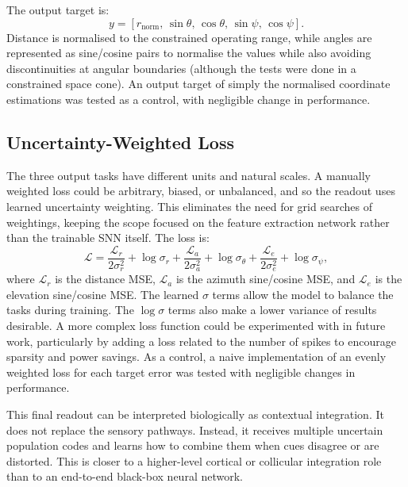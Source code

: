 The output target is:
\begin{equation}
    y =
    \left[
    r_{\text{norm}},\,
    \sin \theta,\,
    \cos \theta,\,
    \sin \psi,\,
    \cos \psi
    \right].
\end{equation}
Distance is normalised to the constrained operating range, while angles are represented as sine/cosine pairs to normalise the values while also avoiding discontinuities at angular boundaries (although the tests were done in a constrained space cone). An output target of simply the normalised coordinate estimations was tested as a control, with negligible change in performance.

\subsection{Uncertainty-Weighted Loss}

The three output tasks have different units and natural scales. A manually weighted loss could be arbitrary, biased, or unbalanced, and so the readout uses learned uncertainty weighting. This eliminates the need for grid searches of weightings, keeping the scope focused on the feature extraction network rather than the trainable SNN itself. The loss is:
\begin{equation}
    \mathcal{L} =
    \frac{\mathcal{L}_r}{2\sigma_r^2} + \log\sigma_r
    + \frac{\mathcal{L}_a}{2\sigma_a^2} + \log\sigma_{\theta}
    + \frac{\mathcal{L}_e}{2\sigma_e^2} + \log\sigma_{\psi},
\end{equation}
where $\mathcal{L}_r$ is the distance MSE, $\mathcal{L}_a$ is the azimuth sine/cosine MSE, and $\mathcal{L}_e$ is the elevation sine/cosine MSE. The learned $\sigma$ terms allow the model to balance the tasks during training. The $\log\sigma$ terms also make a lower variance of results desirable. A more complex loss function could be experimented with in future work, particularly by adding a loss related to the number of spikes to encourage sparsity and power savings. As a control, a naive implementation of an evenly weighted loss for each target error was tested with negligible changes in performance.

This final readout can be interpreted biologically as contextual integration. It does not replace the sensory pathways. Instead, it receives multiple uncertain population codes and learns how to combine them when cues disagree or are distorted. This is closer to a higher-level cortical or collicular integration role than to an end-to-end black-box neural network.

